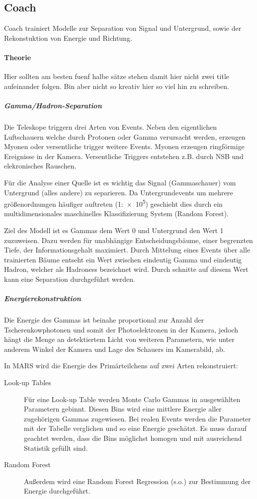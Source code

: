\subsection{Coach}%
\label{sub:coach}
Coach trainiert Modelle zur Separation von Signal und Untergrund, 
sowie der Rekonstuktion von Energie und Richtung.
\paragraph{Theorie}%
{\color{red}Hier sollten am besten fuenf halbe sätze stehen damit hier nicht zwei title aufeinander
folgen. Bin aber nicht so kreativ hier so viel hin zu schreiben.}

\subparagraph{Gamma/Hadron-Separation}
Die Teleskope triggern drei Arten von Events. 
Neben den eigentlichen Luftschauern welche durch Protonen 
oder Gamma verursacht werden,
erzeugen Myonen oder versentliche trigger weitere Events.
Myonen erzeugen ringförmige Ereignisse in der Kamera.
Versentliche Triggers entstehen z.B. durch NSB und elekronisches Rauschen.

Für die Analyse einer Quelle ist es wichtig das Signal (Gammaschauer) vom 
Untergrund (alles andere) zu separieren.
Da Untergrundevents um mehrere größenordnungen häufiger auftreten (1:\num{e5})
geschieht dies durch ein multidimensionales maschinelles Klassifizierung 
System (Random Forest).

Ziel des Modell ist es Gammas dem Wert 0 und Untergrund den Wert 1 zuzuweisen.
Dazu werden für unabhängige Entscheidungsbäume, 
einer begrenzten Tiefe, 
der Informationsgehalt maximiert.
Durch Mittelung eines Events über alle trainierten Bäume entseht ein Wert
zwischen eindeutig Gamma und eindeutig Hadron, welcher als Hadroness bezeichnet
wird.
Durch schnitte auf diesem Wert kann eine Separation durchgeführt werden.

\subparagraph{Energierekonstruktion}%
\label{par:energie}

Die Energie des Gammas ist beinahe proportional
zur Anzahl der Tscherenkowphotonen
und somit der Photoelektronen in der Kamera,
jedoch hängt die Menge an detektiertem Licht von weiteren Parametern,
wie unter anderem Winkel der Kamera und Lage des Schauers im Kamerabild, ab.

In MARS wird die Energie des Primärteilchens auf zwei Arten rekonstruiert:
\begin{description}
	\item[\quad Look-up Tables] Für eine Look-up Table werden Monte Carlo 
		Gammas in ausgewählten Parametern gebinnt.
		Diesen Bins wird eine mittlere Energie aller
		zugehörigen Gammas zugewiesen.
		Bei realen Events werden die Parameter mit der Tabelle verglichen
		und so eine Energie geschätzt.
		Es muss darauf geachtet werden,
		dass die Bins möglichst homogen und mit ausreichend Statistik gefüllt sind.
	\item[\quad Random Forest] Außerdem wird eine Random Forest Regression (s.o.)
		zur Bestimmung der Energie durchgeführt.
\end{description}

